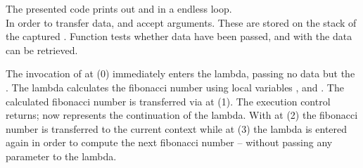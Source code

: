 The presented code prints out  and  in a endless loop.\\

In order to transfer data, \callcc and \resume accept arguments. These are
stored on the stack of the captured \currcont. Function \dataavail tests whether data
have been passed, and with \getdata the data can be retrieved.

The invocation of \callcc at (0) immediately enters the lambda, passing no data
but the \currcont. The lambda calculates the fibonacci number using local
variables ,  and . The calculated fibonacci number is
transferred via \resume at (1). The execution control returns;  now
represents the continuation of the lambda. With \getdata at (2) the fibonacci
number is transferred to the current context while at (3) the lambda is entered
again in order to compute the next fibonacci number -- without passing any
parameter to the lambda.
